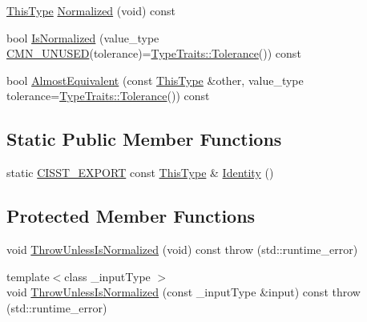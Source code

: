 \begin{DoxyCompactItemize}
\item 
\hyperlink{classvct_rodriguez_rotation3_base_add2bccab7f6e86c98b3f97fd00b06dcc}{This\+Type} \hyperlink{classvct_rodriguez_rotation3_base_a6cbaef874949eaabe462045532a3783a}{Normalized} (void) const 
\item 
bool \hyperlink{classvct_rodriguez_rotation3_base_a0a97d695e97f438a230b3e78762391e0}{Is\+Normalized} (value\+\_\+type \hyperlink{cmn_portability_8h_a021894e2626935fa2305434b1e893ff6}{C\+M\+N\+\_\+\+U\+N\+U\+S\+E\+D}(tolerance)=\hyperlink{classcmn_type_traits_adc129bf9867295b90d300768b780fa99}{Type\+Traits\+::\+Tolerance}()) const 
\item 
bool \hyperlink{classvct_rodriguez_rotation3_base_abeb345b269ff6f09eac03cb96217f9a3}{Almost\+Equivalent} (const \hyperlink{classvct_rodriguez_rotation3_base_add2bccab7f6e86c98b3f97fd00b06dcc}{This\+Type} \&other, value\+\_\+type tolerance=\hyperlink{classcmn_type_traits_adc129bf9867295b90d300768b780fa99}{Type\+Traits\+::\+Tolerance}()) const 
\end{DoxyCompactItemize}
\subsection*{Static Public Member Functions}
\begin{DoxyCompactItemize}
\item 
static \hyperlink{cmn_export_macros_8h_a99393e0c3ac434b2605235bbe20684f8}{C\+I\+S\+S\+T\+\_\+\+E\+X\+P\+O\+R\+T} const \hyperlink{classvct_rodriguez_rotation3_base_add2bccab7f6e86c98b3f97fd00b06dcc}{This\+Type} \& \hyperlink{classvct_rodriguez_rotation3_base_af2b3ccba71788c52e9ade4033f1e61dc}{Identity} ()
\end{DoxyCompactItemize}
\subsection*{Protected Member Functions}
\begin{DoxyCompactItemize}
\item 
void \hyperlink{classvct_rodriguez_rotation3_base_a404f78e0162eaa6261bbf29e55e0e6ca}{Throw\+Unless\+Is\+Normalized} (void) const   throw (std\+::runtime\+\_\+error)
\item 
{\footnotesize template$<$class \+\_\+input\+Type $>$ }\\void \hyperlink{classvct_rodriguez_rotation3_base_acde5653d43f7c1c8c2fd83f3fd108079}{Throw\+Unless\+Is\+Normalized} (const \+\_\+input\+Type \&input) const   throw (std\+::runtime\+\_\+error)
\end{DoxyCompactItemize}


